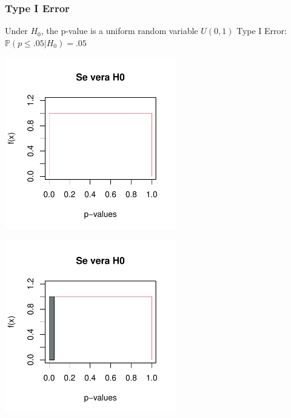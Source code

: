 \documentclass[xcolor={pdftex,dvipsnames,table}]{beamer}
\begin{document}
\begin{frame}
\frametitle{Type I Error}

\begin{overprint}
 {Under $H_0$, the p-value is a uniform random variable $U(0,1)$}
 {Type I Error: $\mathbb{P}(p\leq .05 |H_0)=.05$} %
\end{overprint} 
\begin{overprint} 
 \centerline{\includegraphics[width=7.5cm]{plaatjes/uniform1}}
 \centerline{\includegraphics[width=7.5cm]{plaatjes/uniform2}}
\end{overprint} 
\end{frame}
\end{document}
